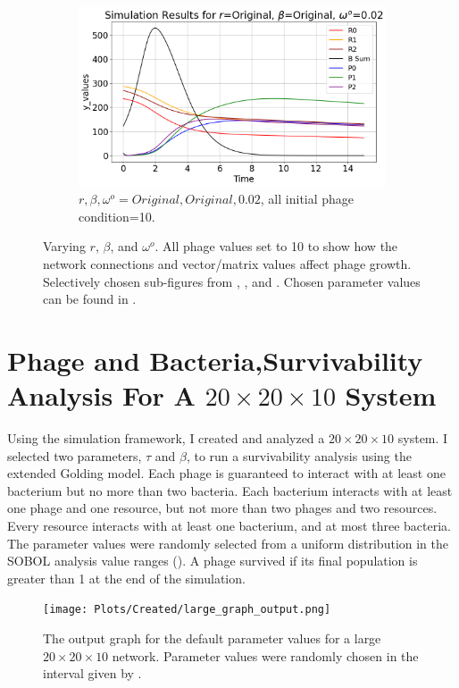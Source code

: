 \begin{figure}[]
\begin{subfigure}{0.32\linewidth}
        \includegraphics[width=\linewidth]{Images/Plots/Created/UA/r_beta_washout_Original_Original_0.02.png}
        \caption{
            $r, \beta, \omega^o = Original, Original, 0.02$, all initial phage condition=10. 
        }
        \label{fig:created:r_beta_washout_original_original_0.02}
    \end{subfigure}
    \caption{
        Varying $r$, $\beta$, and $\omega^o$. 
        All phage values set to 10 to show how the network connections and vector/matrix values affect phage growth. 
        Selectively chosen sub-figures from , , and . 
        Chosen parameter values can be found in . 
    }
    \label{fig:created:r_beta_washout}
\end{figure}

\section{Phage and Bacteria,Survivability Analysis For A $20\times20\times10$ System}
Using the simulation framework, I created and analyzed a $20\times20\times10$ system. 
I selected two parameters, $\tau$ and $\beta$, to run a survivability analysis using the extended Golding model. 
Each phage is guaranteed to interact with at least one bacterium but no more than two bacteria. 
Each bacterium interacts with at least one phage and one resource, but not more than two phages and two resources. 
Every resource interacts with at least one bacterium, and at most three bacteria. 
The parameter values were randomly selected from a uniform distribution in the SOBOL analysis value ranges (). 
A phage survived if its final population is greater than 1 at the end of the simulation. 

\begin{figure}[]
    \texttt{[image: Plots/Created/large\_graph\_output.png]}
    \centering
    \caption{
        The output graph for the default parameter values for a large $20\times 20 \times 10$ network. 
        Parameter values were randomly chosen in the interval given by . 
    \label{fig:created:large_graph_output}
    }
\end{figure}
